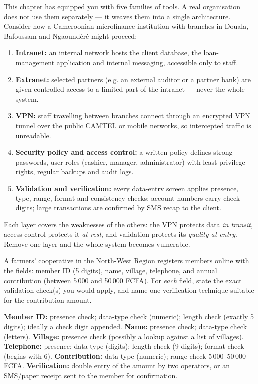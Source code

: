 \documentclass[11pt]{article}
\newcounter{popsec}
\newcounter{popsub}
\newcommand{\courssub}[1]{%
  \stepcounter{popsub}%
  \par\vspace{9pt}\noindent{\popxbold\fontsize{11.5}{13}\selectfont\color{popink}{\color{poporange}\thepopsec.\thepopsub}\hspace{6pt}#1}\par\nopagebreak\vspace{4pt}
}
\begin{document}
\courssub{Integration: Building One Coherent Solution}

This chapter has equipped you with five families of tools. A real organisation does not use them separately — it weaves them into a single architecture. Consider how a Cameroonian microfinance institution with branches in Douala, Bafoussam and Ngaoundéré might proceed:

\begin{enumerate}
\item \textbf{Intranet:} an internal network hosts the client database, the loan-management application and internal messaging, accessible only to staff.
\item \textbf{Extranet:} selected partners (e.g. an external auditor or a partner bank) are given controlled access to a limited part of the intranet — never the whole system.
\item \textbf{VPN:} staff travelling between branches connect through an encrypted VPN tunnel over the public CAMTEL or mobile networks, so intercepted traffic is unreadable.
\item \textbf{Security policy and access control:} a written policy defines strong passwords, user roles (cashier, manager, administrator) with least-privilege rights, regular backups and audit logs.
\item \textbf{Validation and verification:} every data-entry screen applies presence, type, range, format and consistency checks; account numbers carry check digits; large transactions are confirmed by SMS recap to the client.
\end{enumerate}

Each layer covers the weaknesses of the others: the VPN protects data \emph{in transit}, access control protects it \emph{at rest}, and validation protects its \emph{quality at entry}. Remove one layer and the whole system becomes vulnerable.

\begin{exercice}
A farmers' cooperative in the North-West Region registers members online with the fields: member ID (5 digits), name, village, telephone, and annual contribution (between 5\,000 and 50\,000 FCFA). For \emph{each} field, state the exact validation check(s) you would apply, and name one verification technique suitable for the contribution amount.
\end{exercice}

\begin{corrige}[Exercise 1]
\textbf{Member ID:} presence check; data-type check (numeric); length check (exactly 5 digits); ideally a check digit appended. \textbf{Name:} presence check; data-type check (letters). \textbf{Village:} presence check (possibly a lookup against a list of villages). \textbf{Telephone:} presence; data-type (digits); length check (9 digits); format check (begins with 6). \textbf{Contribution:} data-type (numeric); range check 5\,000--50\,000 FCFA. \textbf{Verification:} double entry of the amount by two operators, or an SMS/paper receipt sent to the member for confirmation.
\end{corrige}
\end{document}
